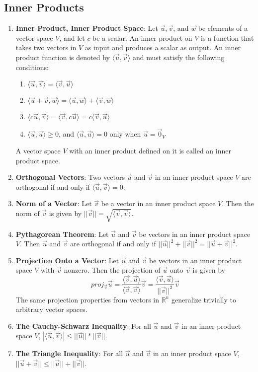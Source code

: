\documentclass[10pt]{article}
\begin{document}
\subsection{Inner Products}
\begin{enumerate}
\item \textbf{Inner Product, Inner Product Space}: Let $\vec{u}, \vec{v}$, and $\vec{w}$ be elements of a vector space $V$, and let $c$ be a scalar. An inner product on $V$ is a function that takes two vectors in $V$ as input and produces a scalar as output. An inner product function is denoted by $\langle \vec{u},\vec{v}\rangle$ and must satisfy the following conditions:
\begin{enumerate}
\item $\langle \vec{u},\vec{v}\rangle = \langle \vec{v},\vec{u}\rangle$
\item $\langle \vec{u} + \vec{v}, \vec{w} \rangle = \langle \vec{u},\vec{w}\rangle + \langle \vec{v},\vec{w}\rangle$
\item $\langle c\vec{u},\vec{v} \rangle = \langle \vec{v}, c\vec{u} \rangle = c \langle \vec{v}, \vec{u} \rangle$
\item $\langle \vec{u}, \vec{u} \rangle \geq 0$, and $\langle \vec{u}, \vec{u} \rangle = 0$ only when $\vec{u} = \vec{0}_V$
\end{enumerate}
A vector space $V$ with an inner product defined on it is called an inner product space.
\item \textbf{Orthogonal Vectors}: Two vectors $\vec{u}$ and $\vec{v}$ in an inner product space $V$ are orthogonal if and only if $\langle \vec{u}, \vec{v} \rangle = 0$.
\item \textbf{Norm of a Vector}: Let $\vec{v}$ be a vector in an inner product space $V$. Then the norm of $\vec{v}$ is given by $||\vec{v}|| = \sqrt{\langle \vec{v}, \vec{v} \rangle}$.
\item \textbf{Pythagorean Theorem}: Let $\vec{u}$ and $\vec{v}$ be vectors in an inner product space $V$. Then $\vec{u}$ and $\vec{v}$ are orthogonal if and only if $||\vec{u}||^2 + ||\vec{v}||^2 = ||\vec{u}+\vec{v}||^2$.
\item \textbf{Projection Onto a Vector}: Let $\vec{u}$ and $\vec{v}$ be vectors in an inner product space $V$ with $\vec{v}$ nonzero. Then the projection of $\vec{u}$ onto $\vec{v}$ is given by
$$proj_{\vec{v}}\vec{u} = \frac{\langle \vec{v}, \vec{u} \rangle}{\langle \vec{v}, \vec{v} \rangle}\vec{v} = \frac{\langle \vec{v}, \vec{u} \rangle}{||\vec{v}||^2}\vec{v}$$
The same projection properties from vectors in $\mathbb{R}^n$ generalize trivially to arbitrary vector spaces.
\item \textbf{The Cauchy-Schwarz Inequality}: For all $\vec{u}$ and $\vec{v}$ in an inner product space $V$, $|\langle \vec{u}, \vec{v} \rangle| \leq ||\vec{u}||*||\vec{v}||$.
\item \textbf{The Triangle Inequality}: For all $\vec{u}$ and $\vec{v}$ in an inner product space $V$, $||\vec{u} + \vec{v}|| \leq ||\vec{u}|| + ||\vec{v}||$.
\end{enumerate}
\end{document}
